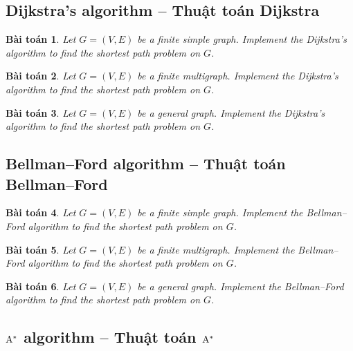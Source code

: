 \documentclass{article}
\newtheorem{baitoan}{Bài toán}
\begin{document}

\subsection{Dijkstra's algorithm -- Thuật toán Dijkstra}

\begin{baitoan}
    Let $G = (V,E)$ be a finite simple graph. Implement the Dijkstra's algorithm to find the shortest path problem on $G$.
\end{baitoan}

\begin{baitoan}
    Let $G = (V,E)$ be a finite multigraph. Implement the Dijkstra's algorithm to find the shortest path problem on $G$.
\end{baitoan}

\begin{baitoan}
    Let $G = (V,E)$ be a general graph. Implement the Dijkstra's algorithm to find the shortest path problem on $G$.
\end{baitoan}


\subsection{Bellman--Ford algorithm -- Thuật toán Bellman--Ford}

\begin{baitoan}
    Let $G = (V,E)$ be a finite simple graph. Implement the Bellman--Ford algorithm to find the shortest path problem on $G$.
\end{baitoan}

\begin{baitoan}
    Let $G = (V,E)$ be a finite multigraph. Implement the Bellman--Ford algorithm to find the shortest path problem on $G$.
\end{baitoan}

\begin{baitoan}
    Let $G = (V,E)$ be a general graph. Implement the Bellman--Ford algorithm to find the shortest path problem on $G$.
\end{baitoan}


\subsection{$\rm A^*$ algorithm -- Thuật toán $\rm A^*$}
\end{document}
